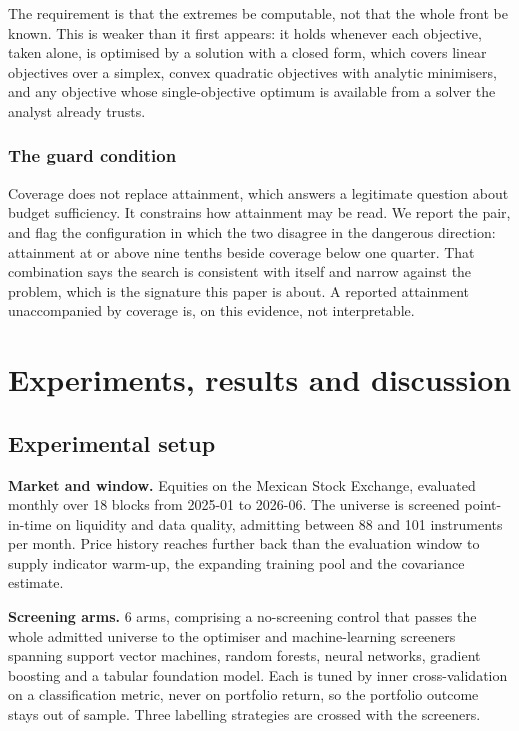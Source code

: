 \documentclass[preprint,11pt,authoryear]{elsarticle}
\begin{document}
The requirement is that the extremes be computable, not that the whole front be known. This is weaker than it first appears: it holds whenever each objective, taken alone, is optimised by a solution with a closed form, which covers linear objectives over a simplex, convex quadratic objectives with analytic minimisers, and any objective whose single-objective optimum is available from a solver the analyst already trusts.

\subsubsection{The guard condition}

Coverage does not replace attainment, which answers a legitimate question about budget sufficiency. It constrains how attainment may be read. We report the pair, and flag the configuration in which the two disagree in the dangerous direction: attainment at or above nine tenths beside coverage below one quarter. That combination says the search is consistent with itself and narrow against the problem, which is the signature this paper is about. A reported attainment unaccompanied by coverage is, on this evidence, not interpretable.


\section{Experiments, results and discussion}\label{sec:experiments}

\subsection{Experimental setup}\label{sec:experimental-setup}

\textbf{Market and window.} Equities on the Mexican Stock Exchange, evaluated monthly over 18 blocks from 2025-01 to 2026-06. The universe is screened point-in-time on liquidity and data quality, admitting between 88 and 101 instruments per month. Price history reaches further back than the evaluation window to supply indicator warm-up, the expanding training pool and the covariance estimate.

\textbf{Screening arms.} 6 arms, comprising a no-screening control that passes the whole admitted universe to the optimiser and machine-learning screeners spanning support vector machines, random forests, neural networks, gradient boosting and a tabular foundation model. Each is tuned by inner cross-validation on a classification metric, never on portfolio return, so the portfolio outcome stays out of sample. Three labelling strategies are crossed with the screeners.
\end{document}
